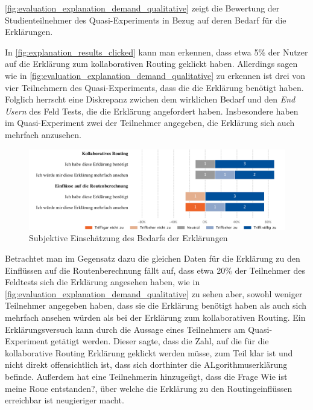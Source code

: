 \autoref{fig:evaluation_explanation_demand_qualitative} zeigt die Bewertung der Studienteilnehmer des Quasi-Experiments in Bezug auf deren Bedarf für die Erklärungen.

In \autoref{fig:explanation_results_clicked} kann man erkennen, dass etwa 5\% der Nutzer auf die Erklärung zum kollaborativen Routing geklickt haben. Allerdings sagen wie in \autoref{fig:evaluation_explanation_demand_qualitative} zu erkennen ist drei von vier Teilnehmern des Quasi-Experiments, dass die die Erklärung benötigt haben. Folglich herrscht eine Diskrepanz zwichen dem wirklichen Bedarf und den \textit{End Usern} des Feld Tests, die die Erklärung angefordert haben. Insbesondere haben im Quasi-Experiment zwei der Teilnehmer angegeben, die Erklärung sich auch mehrfach anzusehen.

\begin{figure}[htb!]
    \centering
    \includegraphics[width=\textwidth]{contents/06_model_evaluation/02_evaluation/res/qualitativeFeedback-evaluation_explanation_demand_qualitative.pdf}
    \caption{Subjektive Einschätzung des Bedarfs der Erklärungen}
    \label{fig:evaluation_explanation_demand_qualitative}
\end{figure}

Betrachtet man im Gegensatz dazu die gleichen Daten für die Erklärung zu den Einflüssen auf die Routenberechnung fällt auf, dass etwa 20\% der Teilnehmer des Feldtests sich die Erklärung angesehen haben, wie in \autoref{fig:evaluation_explanation_demand_qualitative} zu sehen aber, sowohl weniger Teilnehmer angegeben haben, dass sie die Erklärung benötigt haben als auch sich mehrfach ansehen würden als bei der Erklärung zum kollaborativen Routing. Ein Erklärungsversuch kann durch die Aussage eines Teilnehmers am Quasi-Experiment getätigt werden. Dieser sagte, dass die Zahl, auf die für die kollaborative Routing Erklärung geklickt werden müsse, zum Teil klar ist und nicht direkt offensichtlich ist, dass sich dorthinter die ALgorithmuserklärung befinde. Außerdem hat eine Teilnehmerin hinzugeügt, dass die Frage \glqq Wie ist meine Roue entstanden?\grqq{}, über welche die Erklärung zu den Routingeinflüssen erreichbar ist neugieriger macht.

